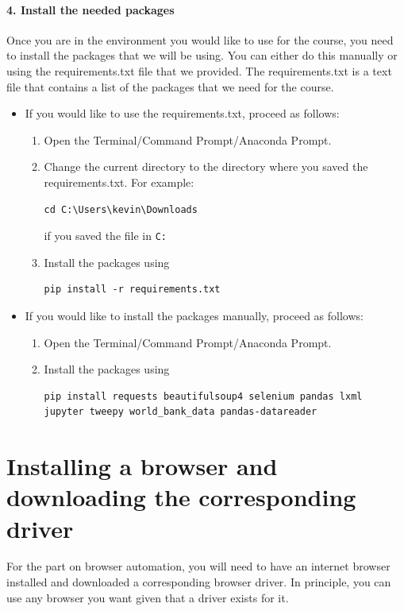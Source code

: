 \documentclass[a4paper]{article}
\begin{document}
\paragraph{4. Install the needed packages} Once you are in the environment you would like to use for the course, you need to install the packages that we will be using. You can either do this manually or using the requirements.txt file that we provided. The requirements.txt is a text file that contains a list of the packages that we need for the course.
\begin{itemize}
	\item If you would like to use the requirements.txt, proceed as follows:
	\begin{enumerate}
		\item Open the Terminal/Command Prompt/Anaconda Prompt.
		\item Change the current directory to the directory where you saved the requirements.txt. For example:
\begin{verbatim}
cd C:\Users\kevin\Downloads
\end{verbatim}
if you saved the file in \texttt{C:\Users\kevin\Downloads}
		\item Install the packages using
\begin{verbatim}
pip install -r requirements.txt
\end{verbatim}
	\end{enumerate}
	\item If you would like to install the packages manually, proceed as follows:
	\begin{enumerate}
		\item Open the Terminal/Command Prompt/Anaconda Prompt.
		\item Install the packages using
\begin{verbatim}
pip install requests beautifulsoup4 selenium pandas lxml jupyter tweepy world_bank_data pandas-datareader
\end{verbatim}
	\end{enumerate}
\end{itemize}

\section{Installing a browser and downloading the corresponding driver}

For the part on browser automation, you will need to have an internet browser installed and downloaded a corresponding browser driver. In principle, you can use any browser you want given that a driver exists for it.
\end{document}
